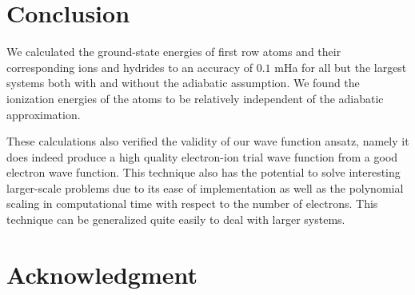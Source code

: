\documentclass[pra,superscriptaddress,groupedaddress,twocolumn]{revtex4}
\begin{document}
\section{Conclusion}
We calculated the ground-state energies of first row atoms and their corresponding ions and hydrides to an accuracy of $0.1$ mHa for all but the largest systems both with and without the adiabatic assumption. We found the ionization energies of the atoms to be relatively independent of the adiabatic approximation.

These calculations also verified the validity of our wave function ansatz, namely it does indeed produce a high quality electron-ion trial wave function from a good electron wave function. This technique also has the potential to solve interesting larger-scale problems due to its ease of implementation as well as the polynomial scaling in computational time with respect to the number of electrons.  This technique can be generalized quite easily to deal with larger systems.

\section{Acknowledgment}



\end{document}
